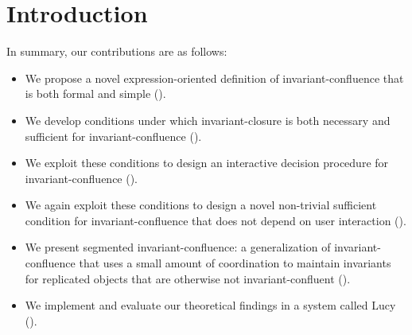 \section{Introduction}
In summary, our contributions are as follows:
\begin{itemize}
  \item
    We propose a novel expression-oriented definition of invariant-confluence
    that is both formal and simple ().

  \item
    We develop conditions under which invariant-closure is both necessary and
    sufficient for invariant-confluence ().

  \item
    We exploit these conditions to design an interactive decision procedure for
    invariant-confluence ().

  \item
    We again exploit these conditions to design a novel non-trivial sufficient
    condition for invariant-confluence that does not depend on user interaction
    ().

  \item
    We present segmented invariant-confluence: a generalization of
    invariant-confluence that uses a small amount of coordination to maintain
    invariants for replicated objects that are otherwise not
    invariant-confluent ().

  \item
    We implement and evaluate our theoretical findings in a system called Lucy
    ().
\end{itemize}

